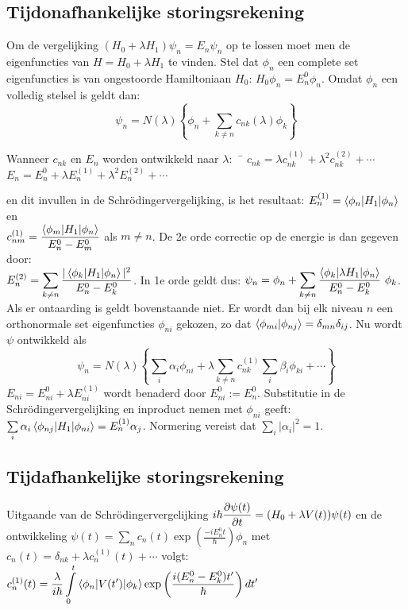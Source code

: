\subsection[~~Tijdonafhankelijke storingsrekening]{Tijdonafhankelijke storingsrekening}
Om de vergelijking $(H_0+\lambda H_1)\psi_n=E_n\psi_n$ op te lossen moet men
de eigenfuncties van $H=H_0+\lambda H_1$ te vinden. Stel dat $\phi_n$ een
complete set eigenfuncties is van ongestoorde Hamiltoniaan $H_0$:
$H_0\phi_n=E_n^0\phi_n$. Omdat $\phi_n$ een volledig stelsel is geldt dan:
\[
\psi_n=N(\lambda)\left\{\phi_n+\sum_{k\neq n}c_{nk}(\lambda)\phi_k\right\}
\]
\begin{tabbing}
Wanneer $c_{nk}$ en $E_n$ worden ontwikkeld naar $\lambda$:~~\=
$c_{nk}=\lambda c_{nk}^{(1)}+\lambda^2 c_{nk}^{(2)}+\cdots$\\
\>$E_n=E_n^0+\lambda E_n^{(1)}+\lambda^2 E_n^{(2)}+\cdots$
\end{tabbing}
en dit invullen in de Schr\"odingervergelijking, is het resultaat:
$E_n^{(1)}=\left\langle \phi_n|H_1|\phi_n \right\rangle$ en\\
$\displaystyle c_{nm}^{(1)}=\frac{\left\langle \phi_m|H_1|\phi_n \right\rangle}{E_n^0-E_m^0}$
als $m\neq n$. De 2e orde correctie op de energie is dan gegeven door:\\
$\displaystyle E^{(2)}_n=\sum_{k\neq n}\frac{|\left\langle \phi_k|H_1|\phi_n \right\rangle|^2}{E^0_n-E^0_k}$.
In 1e orde geldt dus: $\displaystyle\psi_n=\phi_n+\sum_{k\neq n}
\frac{\left\langle \phi_k|\lambda H_1|\phi_n \right\rangle}{E_n^0-E_k^0}~\phi_k$.
\npar
Als er ontaarding is geldt bovenstaande niet. Er wordt dan bij elk niveau $n$
een orthonormale set eigenfuncties $\phi_{ni}$ gekozen, zo dat
$\left\langle \phi_{mi}|\phi_{nj} \right\rangle=\delta_{mn}\delta_{ij}$. Nu wordt $\psi$ ontwikkeld
als
\[
\psi_n=N(\lambda)\left\{\sum_i\alpha_i\phi_{ni}+\lambda\sum_{k\neq n}
c_{nk}^{(1)}\sum_i\beta_i\phi_{ki}+\cdots\right\}
\]
$E_{ni}=E_{ni}^0+\lambda E_{ni}^{(1)}$ wordt benaderd door $E_{ni}^0:=E_n^0$.
Substitutie in de Schr\"odingervergelijking en inproduct nemen met $\phi_{ni}$
geeft: $\sum\limits_i\alpha_i\left\langle \phi_{nj}|H_1|\phi_{ni} \right\rangle=E_n^{(1)}\alpha_j$.
Normering vereist dat $\sum\limits_i|\alpha_i|^2=1$.

\subsection[~~Tijdafhankelijke storingsrekening]{Tijdafhankelijke storingsrekening}
Uitgaande van de Schr\"odingervergelijking
$\displaystyle i\hbar\frac{\partial \psi(t)}{\partial t}=(H_0+\lambda V(t))\psi(t)$
\npar
en de ontwikkeling
$\displaystyle\psi(t)=\sum_nc_n(t)\exp\left(\frac{-iE_n^0t}{\hbar}\right)\phi_n$
met $c_n(t)=\delta_{nk}+\lambda c_n^{(1)}(t)+\cdots$
\npar
volgt: $\displaystyle
c_n^{(1)}(t)=\frac{\lambda}{i\hbar}\int\limits_0^t\left\langle \phi_n|V(t')|\phi_k \right\rangle
\exp\left(\frac{i(E_n^0-E_k^0)t'}{\hbar}\right)dt'$

